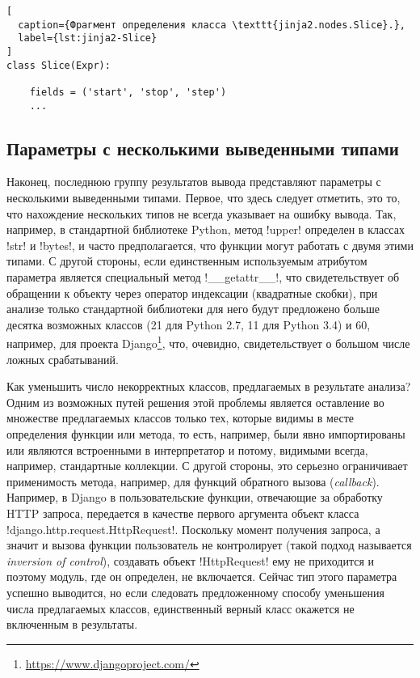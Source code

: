 \begin{lstlisting}[
  caption={Фрагмент определения класса \texttt{jinja2.nodes.Slice}.},
  label={lst:jinja2-Slice}
]
class Slice(Expr):

    fields = ('start', 'stop', 'step')
    ...

\end{lstlisting}

\subsection{Параметры с несколькими выведенными типами}
\label{sub:scattered-type-parameters}

Наконец, последнюю группу результатов вывода представляют параметры с
несколькими выведенными типами. Первое, что здесь следует отметить, это то, что
нахождение нескольких типов не всегда указывает на ошибку вывода. Так, например,
в стандартной библиотеке Python, метод !upper! определен в классах !str! и
!bytes!, и часто предполагается, что функции могут работать с двумя этими
типами. С другой стороны, если единственным используемым атрибутом параметра
является специальный метод !__getattr__!, что свидетельствует об обращении к
объекту через оператор индексации (квадратные скобки), при анализе только
стандартной библиотеки для него будут предложено больше десятка возможных
классов (21 для Python 2.7, 11 для Python 3.4) и 60, например, для проекта
Django\footnote{\url{https://www.djangoproject.com/}}, что, очевидно,
свидетельствует о большом числе ложных срабатываний. 

Как уменьшить число некорректных классов, предлагаемых в результате анализа? 
Одним из возможных путей решения этой проблемы является оставление во множестве
предлагаемых классов только тех, которые видимы в месте определения функции или
метода, то есть, например, были явно импортированы или являются встроенными в
интерпретатор и потому, видимыми всегда, например, стандартные коллекции.
С другой стороны, это серьезно ограничивает применимость метода, например, для
функций обратного вызова (\emph{callback}). Например, в Django в
пользовательские функции, отвечающие за обработку HTTP запроса, передается в
качестве первого аргумента объект класса
!django.http.request.HttpRequest!. Поскольку момент получения запроса, а значит
и вызова функции пользователь не контролирует (такой подход называется
\emph{inversion of control}), создавать объект !HttpRequest! ему не приходится
и поэтому модуль, где он определен, не включается. Сейчас тип этого параметра
успешно выводится, но если следовать предложенному способу уменьшения числа
предлагаемых классов, единственный верный класс окажется не включенным в
результаты.


